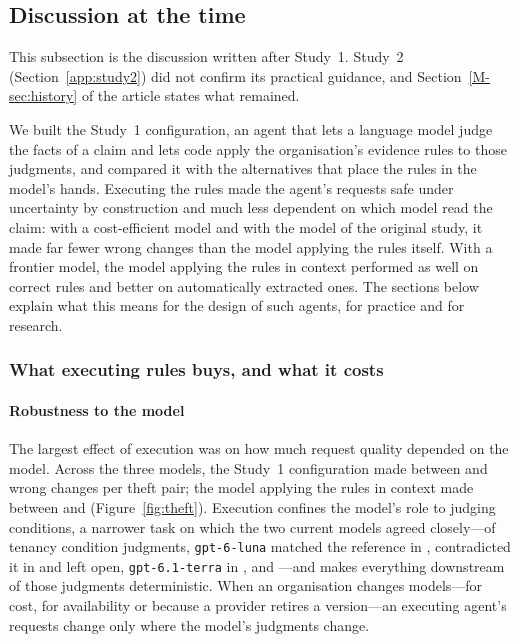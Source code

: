 \subsection{Discussion at the time}
\label{app:s1-discussion}

This subsection is the discussion written after Study~1. Study~2 (Section~\ref{app:study2}) did not confirm its practical guidance, and Section~\ref{M-sec:history} of the article states what remained.

We built the Study~1 configuration, an agent that lets a language model judge the facts of a claim and lets code apply the organisation's evidence rules to those judgments, and compared it with the alternatives that place the rules in the model's hands. Executing the rules made the agent's requests safe under uncertainty by construction and much less dependent on which model read the claim: with a cost-efficient model and with the model of the original study, it made far fewer wrong changes than the model applying the rules itself. With a frontier model, the model applying the rules in context performed as well on correct rules and better on automatically extracted ones. The sections below explain what this means for the design of such agents, for practice and for research.

\subsubsection{What executing rules buys, and what it costs}
\label{app:s1-buys}

\paragraph{Robustness to the model}
The largest effect of execution was on how much request quality depended on the model. Across the three models, the Study~1 configuration made between \thLunaCPWrongPP{} and \rangeCPWrongPPHi{} wrong changes per theft pair; the model applying the rules in context made between \thTerraRWrongPP{} and \rangeRWrongPPHi{} (Figure~\ref{fig:theft}). Execution confines the model's role to judging conditions, a narrower task on which the two current models agreed closely---of \jaTotal{} tenancy condition judgments, \texttt{gpt-6-luna} matched the reference in \jaLunaCorrect, contradicted it in \jaLunaFlipped{} and left \jaLunaUnres{} open, \texttt{gpt-6.1-terra} in \jaCorrect, \jaFlipped{} and \jaUnres---and makes everything downstream of those judgments deterministic. When an organisation changes models---for cost, for availability or because a provider retires a version---an executing agent's requests change only where the model's judgments change.

